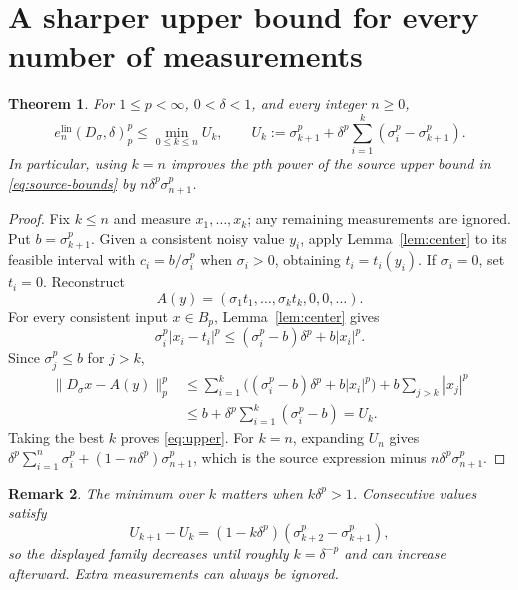 \documentclass[11pt]{article}
\newtheorem{theorem}{Theorem}[section]
\newtheorem{remark}[theorem]{Remark}
\newcommand{\elin}{e^{\mathrm{lin}}}
\newcommand{\ds}{D_\sigma}
\begin{document}
\section{A sharper upper bound for every number of measurements}
\begin{theorem}\label{thm:upper}
For $1\leq p<\infty$, $0<\delta<1$, and every integer $n\geq0$,
\begin{equation}\label{eq:upper}
 \elin_n(\ds,\delta)_p^p\leq
 \min_{0\leq k\leq n} U_k,
 \qquad
 U_k:=\sigma_{k+1}^p+\delta^p\sum_{i=1}^k
 (\sigma_i^p-\sigma_{k+1}^p).
\end{equation}
In particular, using $k=n$ improves the $p$th power of the source upper
bound in \eqref{eq:source-bounds} by $n\delta^p\sigma_{n+1}^p$.
\end{theorem}
\begin{proof}
Fix $k\leq n$ and measure $x_1,\ldots,x_k$; any remaining measurements
are ignored.  Put $b=\sigma_{k+1}^p$.  Given a consistent noisy value $y_i$,
apply Lemma~\ref{lem:center} to its feasible interval with
$c_i=b/\sigma_i^p$ when $\sigma_i>0$, obtaining $t_i=t_i(y_i)$.  If
$\sigma_i=0$, set $t_i=0$.  Reconstruct
\[
 A(y)=(\sigma_1t_1,\ldots,\sigma_kt_k,0,0,\ldots).
\]
For every consistent input $x\in B_p$, Lemma~\ref{lem:center} gives
\[
 \sigma_i^p|x_i-t_i|^p
 \leq (\sigma_i^p-b)\delta^p+b|x_i|^p.
\]
Since $\sigma_j^p\leq b$ for $j>k$,
\begin{align*}
 \|\ds x-A(y)\|_p^p
 &\leq \sum_{i=1}^k\bigl((\sigma_i^p-b)\delta^p+b|x_i|^p\bigr)
       +b\sum_{j>k}|x_j|^p\\
 &\leq b+\delta^p\sum_{i=1}^k(\sigma_i^p-b)=U_k.
\end{align*}
Taking the best $k$ proves \eqref{eq:upper}.  For $k=n$, expanding $U_n$
gives
$\delta^p\sum_{i=1}^n\sigma_i^p+(1-n\delta^p)\sigma_{n+1}^p$, which is
the source expression minus $n\delta^p\sigma_{n+1}^p$.
\end{proof}

\begin{remark}
The minimum over $k$ matters when $k\delta^p>1$.  Consecutive values satisfy
\[
 U_{k+1}-U_k=(1-k\delta^p)
 (\sigma_{k+2}^p-\sigma_{k+1}^p),
\]
so the displayed family decreases until roughly $k=\delta^{-p}$ and can
increase afterward.  Extra measurements can always be ignored.
\end{remark}
\end{document}

